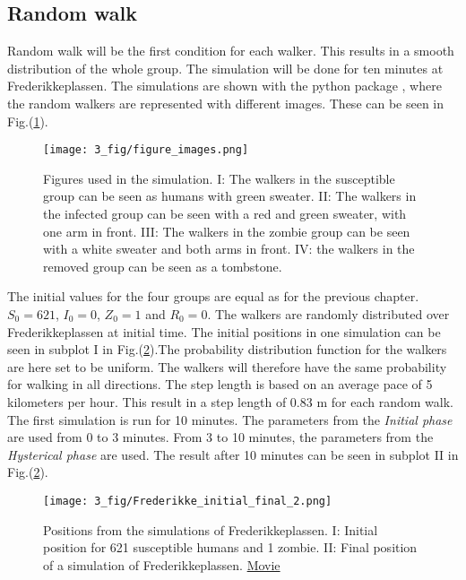 \documentclass[%
twoside,                 %
final,                   %
chapterprefix=true,      %
open=right               %
10pt]{book}
\begin{document}
\subsection{Random walk}
Random walk will be the first condition for each walker. This results in a smooth distribution of the whole group. The simulation will be done for ten minutes at Frederikkeplassen. The simulations are shown with the python package , where the random walkers are represented with different images. These can be seen in Fig.(\ref{fig:figure_images}).


\begin{figure}[ht]
  \centerline{\texttt{[image: 3\_fig/figure\_images.png]}}
  \caption{
  \label{fig:figure_images} Figures used in the simulation. I: The walkers in the susceptible group can be seen as humans with green sweater. II: The walkers in the infected group can be seen with a red and green sweater, with one arm in front. III: The walkers in the zombie group can be seen with a white sweater and both arms in front. IV: the walkers in the removed group can be seen as a tombstone.
  }
\end{figure}


The initial values for the four groups are equal as for the previous chapter. $S_0 = 621$, $I_0 = 0$, $Z_0 = 1$ and $R_0 = 0$. The walkers are randomly distributed over Frederikkeplassen at initial time. The initial positions in one simulation can be seen in subplot I in Fig.(\ref{fig:initial_final}).The probability distribution function for the walkers are here set to be uniform. The walkers will therefore have the same probability for walking in all directions. The step length is based on an average pace of 5 kilometers per hour. This result in a step length of 0.83 m for each random walk. The first simulation is run for 10 minutes. The parameters from the \emph{Initial phase} are used from 0 to 3 minutes. From 3 to 10 minutes, the parameters from the \emph{Hysterical phase} are used. The result after 10 minutes can be seen in subplot II in Fig.(\ref{fig:initial_final}). 


\vspace{3mm}




\vspace{3mm}




\begin{figure}[ht]
  \centerline{\texttt{[image: 3\_fig/Frederikke\_initial\_final\_2.png]}}
  \caption{
  \label{fig:initial_final} Positions from the simulations of Frederikkeplassen. I: Initial position for 621 susceptible humans and 1 zombie. II: Final position of a simulation of Frederikkeplassen. \href{{https://torbjornseland.github.io/master}}{Movie}
  }
\end{figure}
\end{document}
